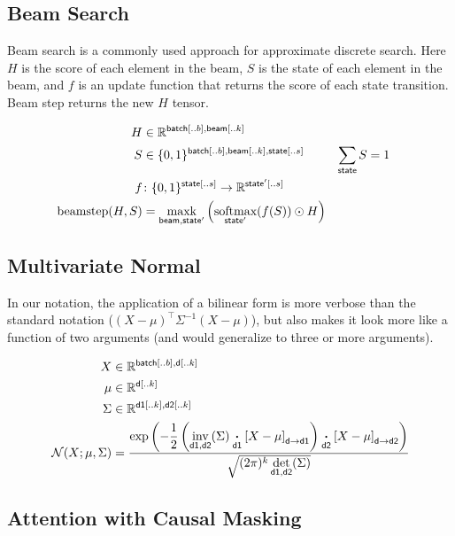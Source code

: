 \documentclass{article}
\newcommand{\reals}{\mathbb{R}}
\begin{document}
\subsection{Beam Search}

Beam search is a commonly used approach for approximate discrete search. Here $H$ is the score of each element in the beam, $S$ is the state of each element in the beam, and $f$ is an update function that returns the score of each state transition. 
Beam step returns the new $H$ tensor. 

\begin{align*} 
H &\in \reals^{{\nset{batch}{..b}, \nset{beam}{..k}}} \\
S &\in \{0, 1\}^{{\nset{batch}{..b}, \nset{beam}{..k}, \nset{state}{..s}}} & \nsum{state} S &= 1\\
f &\colon \{0, 1\}^{{\nset{state}{..s}}} \rightarrow \reals^{{\nset{state'}{..s}}} \\ 
\text{beamstep}(H, S) &= \nfun{beam, state'}{maxk} \left( \nfun{state'}{softmax}(f(S)) \odot H \right)
\end{align*} 

\subsection{Multivariate Normal}

In our notation, the application of a bilinear form is more verbose than the standard notation ($(X-\mu)^\top \Sigma^{-1} (X-\mu)$), but also makes it look more like a function of two arguments (and would generalize to three or more arguments).

\begin{align*} 
X &\in \reals^{\nset{batch}{..{b}}, \nset{d}{..{k}}}  \\
\mu &\in \reals^{{\nset{d}{..{k}}}}  \\
\Sigma & \in   \reals^{{\nset{d1}{..{k}}, \nset{d2}{..{k}}}}  \\
{\cal N}(X; \mu, \Sigma) &= \frac{\displaystyle \exp\left(-\frac{1}{2}  \left(\nfun{d1, d2}{inv}(\Sigma) \ndot{d1} \nmov{d}{d1}{X - \mu} \right) \ndot{d2} \nmov{d}{d2}{X - \mu} \right)}{\sqrt{(2 \pi)^k \nfun{d1, d2}{det}(\Sigma)}}
\end{align*}


\subsection{Attention with Causal Masking}
\end{document}
